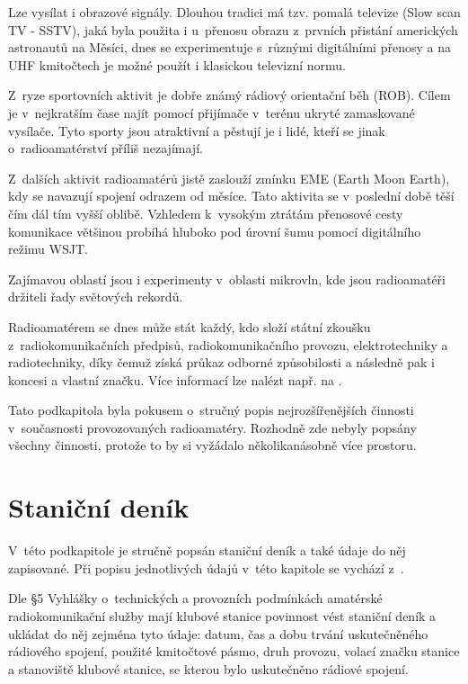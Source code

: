 Lze vysílat i obrazové signály. Dlouhou tradici má tzv. pomalá televize (Slow
    scan TV - SSTV),
jaká byla použita i u~přenosu obrazu z~prvních přistání amerických astronautů na Měsíci,
dnes se experimentuje s~různými digitálními přenosy a na UHF kmitočtech je možné
použít i klasickou televizní normu.

Z~ryze sportovních aktivit je dobře známý rádiový
orientační běh (ROB). Cílem je v~nejkratším čase najít pomocí
přijímače v~terénu ukryté zamaskované vysílače. 
Tyto sporty jsou atraktivní a pěstují je i lidé, kteří se jinak o~radioamatérství příliš nezajímají.

Z~dalších aktivit radioamatérů jistě zaslouží zmínku EME (Earth Moon Earth), kdy
se navazují spojení odrazem od měsíce. Tato aktivita se v~poslední době těší čím
dál tím vyšší oblibě. Vzhledem k~vysokým ztrátám přenosové cesty
komunikace většinou probíhá hluboko pod úrovní šumu pomocí digitálního režimu WSJT.

Zajímavou oblastí jsou i experimenty v~oblasti mikrovln, kde jsou radioamatéři
držiteli řady světových rekordů. 

Radioamatérem se dnes může stát každý, kdo
složí státní zkoušku z~radiokomunikačních předpisů, radiokomunikačního provozu,
elektrotechniky a radiotechniky, díky čemuž získá průkaz odborné způsobilosti a
následně pak i koncesi a vlastní značku. Více informací lze nalézt např. na
\cite{jak_se_stat}.

Tato podkapitola byla pokusem o~stručný popis nejrozšířenějších činnosti v~současnosti provozovaných
radioamatéry. Rozhodně zde nebyly popsány všechny činnosti, protože to by si
vyžádalo několikanásobně více prostoru. 

\section{Staniční deník}
\label{stanicni_denik}

V~této podkapitole je stručně popsán staniční deník a také údaje do něj zapisované.
Při popisu jednotlivých údajů v~této kapitole se vychází z~\cite{pozadavky}.

Dle §5 Vyhlášky o~technických a provozních podmínkách amatérské radiokomunikační služby \cite{vyhlaska}
mají klubové stanice povinnost vést staniční deník a ukládat do něj zejména tyto údaje: datum, čas a dobu trvání
uskutečněného rádiového spojení, použité kmitočtové pásmo, druh provozu,
volací značku stanice a stanoviště klubové stanice, se kterou bylo uskutečněno rádiové spojení.

